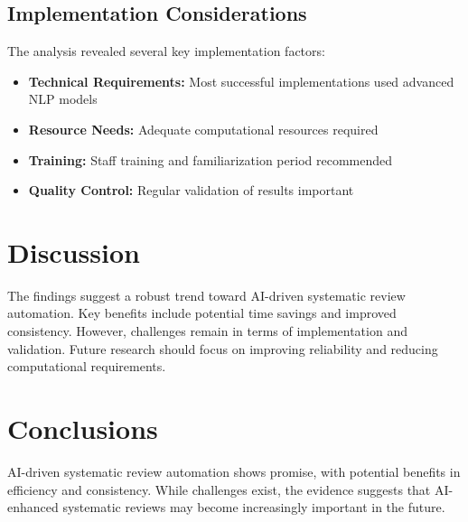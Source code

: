 \documentclass{article}%
\begin{document}
\subsection{Implementation Considerations}%
\label{subsec:ImplementationConsiderations}%
The analysis revealed several key implementation factors:%
\begin{itemize}%
\item \textbf{Technical Requirements:} Most successful implementations used advanced NLP models%
\item \textbf{Resource Needs:} Adequate computational resources required%
\item \textbf{Training:} Staff training and familiarization period recommended%
\item \textbf{Quality Control:} Regular validation of results important%
\end{itemize}

%
\section{Discussion}%
\label{sec:Discussion}%
The findings suggest a robust trend toward AI{-}driven systematic review automation. %
Key benefits include potential time savings and improved consistency. %
However, challenges remain in terms of implementation and validation. %
Future research should focus on improving reliability and reducing computational requirements.

%
\section{Conclusions}%
\label{sec:Conclusions}%
AI{-}driven systematic review automation shows promise, with potential benefits in efficiency and consistency. %
While challenges exist, the evidence suggests that AI{-}enhanced systematic reviews may become increasingly important in the future.

%
\end{document}
